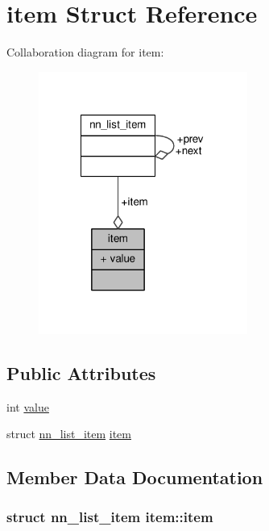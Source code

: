 \hypertarget{structitem}{}\section{item Struct Reference}
\label{structitem}


Collaboration diagram for item\+:
\nopagebreak
\begin{figure}[H]
\begin{center}
\leavevmode
\includegraphics[width=194pt]{structitem__coll__graph}
\end{center}
\end{figure}
\subsection*{Public Attributes}
\begin{DoxyCompactItemize}
\item 
int \hyperlink{structitem_a48e03a66deef7b4ec95296391a17a420}{value}
\item 
struct \hyperlink{structnn__list__item}{nn\+\_\+list\+\_\+item} \hyperlink{structitem_adbc4635da385d1cea2cb4957467a47f9}{item}
\end{DoxyCompactItemize}


\subsection{Member Data Documentation}
\subsubsection[{item}]{\setlength{\rightskip}{0pt plus 5cm}struct {\bf nn\+\_\+list\+\_\+item} item\+::item}\hypertarget{structitem_adbc4635da385d1cea2cb4957467a47f9}{}\label{structitem_adbc4635da385d1cea2cb4957467a47f9}
